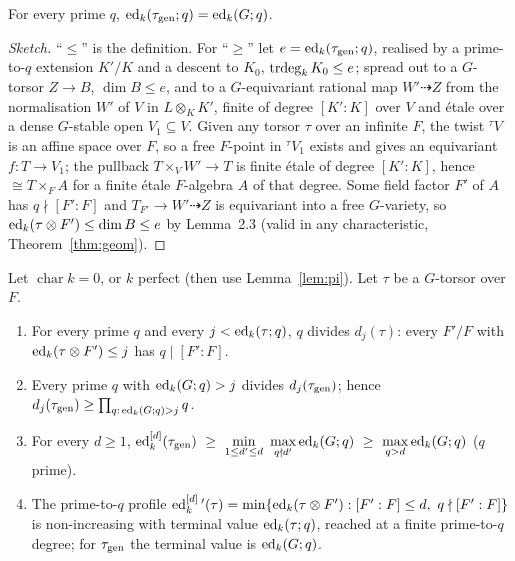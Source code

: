 \begin{proposition}\label{prop:genq}
For every prime $q$, $\operatorname{ed}_k(\tau_{\mathrm{gen}};q)=\operatorname{ed}_k(G;q)$.
\end{proposition}

\begin{proof}[Sketch]
``$\le$'' is the definition. For ``$\ge$'' let $e=\operatorname{ed}_k(\tau_{\mathrm{gen}};q)$, realised by a
prime-to-$q$ extension $K'/K$ and a descent to $K_0$, $\operatorname{trdeg}_kK_0\le e$; spread out to a
$G$-torsor $Z\to B$, $\dim B\le e$, and to a $G$-equivariant rational map
$W'\dashrightarrow Z$ from the normalisation $W'$ of $V$ in $L\otimes_KK'$, finite of
degree $[K':K]$ over $V$ and \'etale over a dense $G$-stable open $V_1\subseteq V$.
Given any torsor $\tau$ over an infinite $F$, the twist ${}^\tau V$ is an affine space
over $F$, so a free $F$-point in ${}^\tau V_1$ exists and gives an equivariant
$f\colon T\to V_1$; the pullback $T\times_VW'\to T$ is finite \'etale of degree
$[K':K]$, hence $\cong T\times_FA$ for a finite \'etale $F$-algebra $A$ of that degree.
Some field factor $F'$ of $A$ has $q\nmid[F':F]$ and $T_{F'}\to W'\dashrightarrow Z$ is
equivariant into a free $G$-variety, so $\operatorname{ed}_k(\tau\otimes F')\le\dim B\le e$ by
Lemma~2.3 (valid in any characteristic, Theorem~\ref{thm:geom}).
\end{proof}

\begin{theorem}\label{thm:div}
Let $\operatorname{char}k=0$, or $k$ perfect (then use Lemma~\ref{lem:pi}). Let
$\tau$ be a $G$-torsor over $F$.
\begin{enumerate}
\item[(a)] For every prime $q$ and every $j<\operatorname{ed}_k(\tau;q)$, $q$ divides $d_j(\tau)$:
every $F'/F$ with $\operatorname{ed}_k(\tau\otimes F')\le j$ has $q\mid[F':F]$.
\item[(b)] Every prime $q$ with $\operatorname{ed}_k(G;q)>j$ divides $d_j(\tau_{\mathrm{gen}})$; hence
$d_j(\tau_{\mathrm{gen}})\ge\prod_{q:\,\operatorname{ed}_k(G;q)>j}q$.
\item[(c)] For every $d\ge1$,
$\displaystyle\edd d_k(\tau_\gen)\ \ge\ \min_{1\le d'\le d}\ \max_{q\nmid d'}\ed_k(G;q)
\ \ge\ \max_{q>d}\ed_k(G;q)$ ($q$ prime).
\item[(d)] The prime-to-$q$ profile $\operatorname{ed}^{[d]}_k{}'(\tau)=\min\{\operatorname{ed}_k(\tau\otimes F'):
[F':F]\le d,\ q\nmid[F':F]\}$ is non-increasing with terminal value $\operatorname{ed}_k(\tau;q)$,
reached at a finite prime-to-$q$ degree; for $\tau_{\mathrm{gen}}$ the terminal value is
$\operatorname{ed}_k(G;q)$.
\end{enumerate}
\end{theorem}

